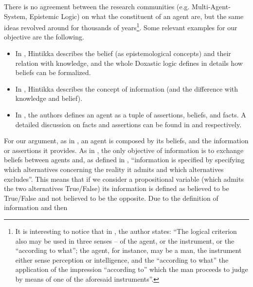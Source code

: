 \documentclass[conference]{IEEEtran}
\begin{document}
There is no agreement between the research communities (e.g.
Multi-Agent-System, Epistemic Logic) on what the constituent of an agent are,
but the same ideas revolved around for thousands of years\footnote{
It is interesting to notice that 
in \autocite{Empiricus1990Pyrrhonism}, the author states: ``The logical
criterion also may be used in three senses -- of the agent, or the instrument,
or the ``according to what''; the agent, for instance, may be a man, the
instrument either sense perception or intelligence, and the ``according to
what'' the application of the impression ``according to'' which the man
proceeds to judge by means of one of the aforesaid instruments''.}.
Some relevant examples for our objective are the following.
\begin{itemize}
	\item In \autocite{Hintikka1962knowledge}, Hintikka describes the
		belief (as epistemological
		concepts) and their relation with knowledge,
		and the whole Doxastic logic defines in details how
		beliefs can be formalized.
	\item In \autocite{Hintikka1993Information}, Hintikka describes the concept
		of information (and the difference with knowledge and belief).
	\item In \autocite{Santaca2016abf}, the authors defines an agent as a
		tuple of assertions, beliefs, and facts. A detailed discussion
		on facts and assertions can be found in \autocite{facts2007stanford} and
		\autocite{assertion2007stanford} respectively.
\end{itemize}
For our argument, as in \autocite{Santaca2016abf}, an agent is composed by its
beliefs, and the information or assertions it provides.
As in \autocite{Steup2020epistemology}, the only objective of information is to
exchange beliefs between agents and, as defined in \autocite{Hintikka1993Information},
``information is specified by specifying which alternatives concerning the
reality it admits and which alternatives excludes''. This means that if we
consider a propositional variable (which admits the two alternatives
True/False) its information is defined as believed to be True/False and not
believed to be the opposite.  Due to the definition of information and then
\end{document}
